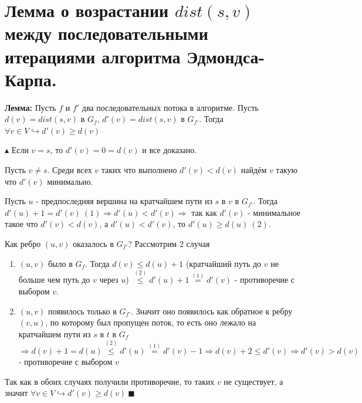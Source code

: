 \section{Лемма о возрастании $dist(s, v)$ между последовательными итерациями алгоритма Эдмондса-Карпа.}
\par \textbf{Лемма:} Пусть $f$ и $f'$ два последовательных потока в алгоритме. Пусть $d(v)=dist(s,v)$ в $G_f$, $d'(v)=dist(s,v)$ в $G_{f'}$. Тогда $\forall v \in V \hookrightarrow d'(v) \geq d(v)$
\par $\blacktriangle$ Если $v=s$, то $d'(v)=0=d(v)$ и все доказано.
\par Пусть $v \neq s$. Среди всех $v$ таких что выполнено $d'(v)<d(v)$ найдём $v$ такую что $d'(v)$ минимально.
\par Пусть $u$ - предпоследняя вершина на кратчайшем пути из $s$ в $v$ в $G_{f'}$. Тогда $d'(u)+1=d'(v) \: (1)\Rightarrow d'(u) < d'(v) \Rightarrow$ так как $d'(v)$ - минимальное такое что $d'(v)<d(v)$, а $d'(u)<d'(v)$, то $d'(u) \geq d(u) \: (2)$.
\par Как ребро $(u,v)$ оказалось в $G_{f'}$? Рассмотрим 2 случая \begin{enumerate}
    \item $(u,v)$ было в $G_f$. Тогда $d(v)\leq d(u)+1$ (кратчайший путь до $v$ не больше чем путь до $v$ через $u$) $\stackrel{(2)}{\leq} d'(u)+1 \stackrel{(1)}{=} d'(v)$ - противоречие с выбором $v$.
    \item $(u,v)$ появилось только в $G_{f'}$. Значит оно появилось как обратное к ребру $(v,u)$, по которому был пропущен поток, то есть оно лежало на кратчайшем пути из $s$ в $t$ в $G_f$ $\Rightarrow d(v)+1=d(u)\stackrel{(2)}{\leq} d'(u)\stackrel{(1)}{=} d'(v)-1 \Rightarrow d(v)+2\leq d'(v) \Rightarrow d'(v)>d(v)$ - противоречие с выбором $v$
\end{enumerate}
\par Так как в обоих случаях получили противоречие, то таких $v$ не существует, а значит $\forall v \in V \hookrightarrow d'(v) \geq d(v) \: \blacksquare$

\setcounter{section}{78}
